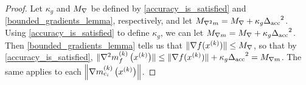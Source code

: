 \begin{proof}

Let $\kappa_g$ and ${M_{\nabla}}$ be defined by \cref{accuracy_is_satisfied} and \cref{bounded_gradients_lemma}, respectively,
and let ${M_{\nabla^2 m}} = {M_{\nabla}} + \kappa_g {\Delta_{\textrm{acc}}}^2$.
Using \cref{accuracy_is_satisfied} to define $\kappa_g$, we can let ${M_{\nabla m}} = {M_{\nabla}} + \kappa_g {\Delta_{\textrm{acc}}}^2$.
Then \cref{bounded_gradients_lemma} tells us that
$\|\nabla f(x^{(k)})\| \le {M_{\nabla}}$, so that by \cref{accuracy_is_satisfied},
$\|{\nabla^2m_f^{(k)}\left(x^{(k)}\right)}\| \le \|\nabla f(x^{(k)})\| + \kappa_g{\Delta_{\textrm{acc}}}^2 = {M_{\nabla m}}$.
The same applies to each $\left\|{\nabla m_{c_i}^{(k)}\left(x^{(k)}\right)}\right\|$.
\end{proof}



